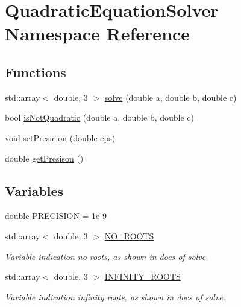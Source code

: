 \hypertarget{namespaceQuadraticEquationSolver}{}\section{Quadratic\+Equation\+Solver Namespace Reference}
\label{namespaceQuadraticEquationSolver}
\subsection*{Functions}
\begin{DoxyCompactItemize}
\item 
std\+::array$<$ double, 3 $>$ \hyperlink{namespaceQuadraticEquationSolver_a2fdb492d7c7c91571ef52b4365e69f96}{solve} (double a, double b, double c)
\item 
bool \hyperlink{namespaceQuadraticEquationSolver_a4f2ae1f720093c71706f80e9945bfbe6}{is\+Not\+Quadratic} (double a, double b, double c)
\item 
void \hyperlink{namespaceQuadraticEquationSolver_a938d16238c9d7b6fc6196eafd8b1d49d}{set\+Presicion} (double eps)
\item 
double \hyperlink{namespaceQuadraticEquationSolver_a7dac20c6acd080ae03efb79265ad0fb6}{get\+Presison} ()
\end{DoxyCompactItemize}
\subsection*{Variables}
\begin{DoxyCompactItemize}
\item 
double \hyperlink{namespaceQuadraticEquationSolver_ad4a5b33521868e40baa80093d2759dbf}{P\+R\+E\+C\+I\+S\+I\+ON} = 1e-\/9
\item 
std\+::array$<$ double, 3 $>$ \hyperlink{namespaceQuadraticEquationSolver_a58fb06e9e5032bb24dee59668f208036}{N\+O\+\_\+\+R\+O\+O\+TS}
\begin{DoxyCompactList}\small\item\em Variable indication no roots, as shown in docs of solve. \end{DoxyCompactList}\item 
std\+::array$<$ double, 3 $>$ \hyperlink{namespaceQuadraticEquationSolver_a25a5da2c76273836195af9d508b8e571}{I\+N\+F\+I\+N\+I\+T\+Y\+\_\+\+R\+O\+O\+TS}
\begin{DoxyCompactList}\small\item\em Variable indication infinity roots, as shown in docs of solve. \end{DoxyCompactList}\end{DoxyCompactItemize}


